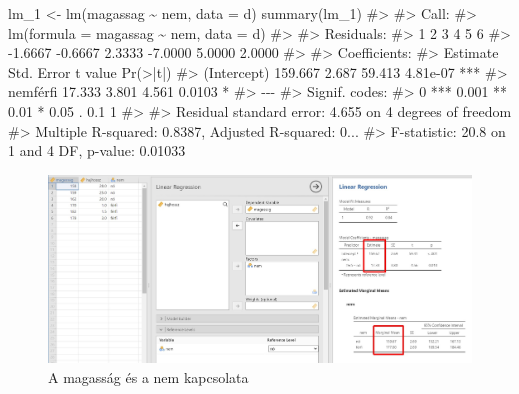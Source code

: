 \documentclass[
  letterpaper,
]{krantz}
\makeatletter
\newenvironment{Shaded}{\begin{snugshade}}{\end{snugshade}}
\newcommand{\AttributeTok}[1]{\textcolor[rgb]{0.40,0.45,0.13}{#1}}
\newcommand{\CommentTok}[1]{\textcolor[rgb]{0.37,0.37,0.37}{#1}}
\newcommand{\FunctionTok}[1]{\textcolor[rgb]{0.28,0.35,0.67}{#1}}
\newcommand{\NormalTok}[1]{\textcolor[rgb]{0.00,0.23,0.31}{#1}}
\newcommand{\OtherTok}[1]{\textcolor[rgb]{0.00,0.23,0.31}{#1}}
\newcommand{\SpecialCharTok}[1]{\textcolor[rgb]{0.37,0.37,0.37}{#1}}
\newenvironment{kframe}{%
\medskip{}
\setlength{\fboxsep}{.8em}
 \def\at@end@of@kframe{}%
 \ifinner\ifhmode%
  \def\at@end@of@kframe{\end{minipage}}%
  \begin{minipage}{\columnwidth}%
 \fi\fi%
 \def\FrameCommand##1{\hskip\@totalleftmargin \hskip-\fboxsep
 \colorbox{shadecolor}{##1}\hskip-\fboxsep
     \hskip-\linewidth \hskip-\@totalleftmargin \hskip\columnwidth}%
 \MakeFramed {\advance\hsize-\width
   \@totalleftmargin\z@ \linewidth\hsize
   \@setminipage}}%
 {\par\unskip\endMakeFramed%
 \at@end@of@kframe}
\renewenvironment{Shaded}{\begin{kframe}}{\end{kframe}}
\makeatother
\begin{document}
\begin{Shaded}
\begin{Highlighting}[]
\NormalTok{lm\_1 }\OtherTok{\textless{}{-}} \FunctionTok{lm}\NormalTok{(magassag }\SpecialCharTok{\textasciitilde{}}\NormalTok{ nem, }\AttributeTok{data =}\NormalTok{ d)}
\FunctionTok{summary}\NormalTok{(lm\_1)}
\CommentTok{\#\textgreater{} }
\CommentTok{\#\textgreater{} Call:}
\CommentTok{\#\textgreater{} lm(formula = magassag \textasciitilde{} nem, data = d)}
\CommentTok{\#\textgreater{} }
\CommentTok{\#\textgreater{} Residuals:}
\CommentTok{\#\textgreater{}       1       2       3       4       5       6 }
\CommentTok{\#\textgreater{} {-}1.6667 {-}0.6667  2.3333 {-}7.0000  5.0000  2.0000 }
\CommentTok{\#\textgreater{} }
\CommentTok{\#\textgreater{} Coefficients:}
\CommentTok{\#\textgreater{}             Estimate Std. Error t value Pr(\textgreater{}|t|)    }
\CommentTok{\#\textgreater{} (Intercept)  159.667      2.687  59.413 4.81e{-}07 ***}
\CommentTok{\#\textgreater{} nemférfi      17.333      3.801   4.561   0.0103 *  }
\CommentTok{\#\textgreater{} {-}{-}{-}}
\CommentTok{\#\textgreater{} Signif. codes:  }
\CommentTok{\#\textgreater{} 0 \textquotesingle{}***\textquotesingle{} 0.001 \textquotesingle{}**\textquotesingle{} 0.01 \textquotesingle{}*\textquotesingle{} 0.05 \textquotesingle{}.\textquotesingle{} 0.1 \textquotesingle{} \textquotesingle{} 1}
\CommentTok{\#\textgreater{} }
\CommentTok{\#\textgreater{} Residual standard error: 4.655 on 4 degrees of freedom}
\CommentTok{\#\textgreater{} Multiple R{-}squared:  0.8387, Adjusted R{-}squared:  0...}
\CommentTok{\#\textgreater{} F{-}statistic:  20.8 on 1 and 4 DF,  p{-}value: 0.01033}
\end{Highlighting}
\end{Shaded}

\begin{figure}

{\centering \includegraphics{./images/lin_reg_magassag_hajhossz_nem_01_kep_01.jpg}

}

\caption{A magasság és a nem kapcsolata}

\end{figure}
\end{document}
